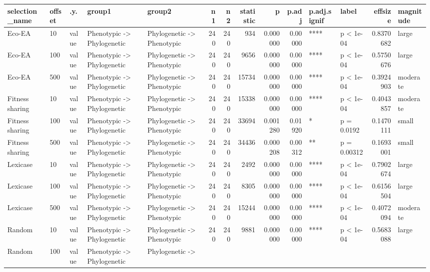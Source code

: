 \documentclass[]{book}
\begin{document}
\begin{table}
\centering
\begin{tabular}[t]{l|l|l|l|l|r|r|r|r|r|l|l|r|l}
\hline
selection\_name & offset & .y. & group1 & group2 & n1 & n2 & statistic & p & p.adj & p.adj.signif & label & effsize & magnitude\\
\hline
Eco-EA & 10 & value & Phenotypic
    ->
Phylogenetic & Phylogenetic
    ->
Phenotypic & 240 & 240 & 934 & 0.000000 & 0.00000 & **** & p < 1e-04 & 0.8370682 & large\\
\hline
Eco-EA & 100 & value & Phenotypic
    ->
Phylogenetic & Phylogenetic
    ->
Phenotypic & 240 & 240 & 9656 & 0.000000 & 0.00000 & **** & p < 1e-04 & 0.5750676 & large\\
\hline
Eco-EA & 500 & value & Phenotypic
    ->
Phylogenetic & Phylogenetic
    ->
Phenotypic & 240 & 240 & 15734 & 0.000000 & 0.00000 & **** & p < 1e-04 & 0.3924903 & moderate\\
\hline
Fitness sharing & 10 & value & Phenotypic
    ->
Phylogenetic & Phylogenetic
    ->
Phenotypic & 240 & 240 & 15338 & 0.000000 & 0.00000 & **** & p < 1e-04 & 0.4043857 & moderate\\
\hline
Fitness sharing & 100 & value & Phenotypic
    ->
Phylogenetic & Phylogenetic
    ->
Phenotypic & 240 & 240 & 33694 & 0.001280 & 0.01920 & * & p = 0.0192 & 0.1470111 & small\\
\hline
Fitness sharing & 500 & value & Phenotypic
    ->
Phylogenetic & Phylogenetic
    ->
Phenotypic & 240 & 240 & 34436 & 0.000208 & 0.00312 & ** & p = 0.00312 & 0.1693001 & small\\
\hline
Lexicase & 10 & value & Phenotypic
    ->
Phylogenetic & Phylogenetic
    ->
Phenotypic & 240 & 240 & 2492 & 0.000000 & 0.00000 & **** & p < 1e-04 & 0.7902674 & large\\
\hline
Lexicase & 100 & value & Phenotypic
    ->
Phylogenetic & Phylogenetic
    ->
Phenotypic & 240 & 240 & 8305 & 0.000000 & 0.00000 & **** & p < 1e-04 & 0.6156504 & large\\
\hline
Lexicase & 500 & value & Phenotypic
    ->
Phylogenetic & Phylogenetic
    ->
Phenotypic & 240 & 240 & 15244 & 0.000000 & 0.00000 & **** & p < 1e-04 & 0.4072094 & moderate\\
\hline
Random & 10 & value & Phenotypic
    ->
Phylogenetic & Phylogenetic
    ->
Phenotypic & 240 & 240 & 9881 & 0.000000 & 0.00000 & **** & p < 1e-04 & 0.5683088 & large\\
\hline
Random & 100 & value & Phenotypic
    ->
Phylogenetic & Phylogenetic
    ->

\end{tabular}
\end{table}
\end{document}
